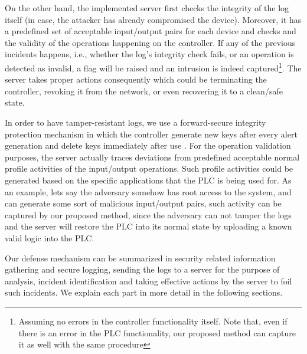 On the other hand, the implemented server first checks the integrity of the log itself (in case, the attacker has already compromised the device). Moreover, it has a predefined set of acceptable input/output pairs for each device and checks and the validity of the operations happening on the controller. If any of the previous incidents happens, i.e., whether the log's integrity check fails, or an operation is detected as invalid, a flag will be raised and an intrusion is indeed captured\footnote{Assuming no errors in the controller functionality itself. Note that, even if there is an error in the PLC functionality, our proposed method can capture it as well with the same procedure}. The server takes proper actions consequently which could be terminating the controller, revoking it from the network, or even recovering it to a clean/safe state.

In order to have tamper-resistant logs, we use a forward-secure integrity protection mechanism in which the controller generate new keys after every alert generation and delete keys immediately after use \cite{pillarbox}. For the operation validation purposes, the server actually traces deviations from predefined acceptable normal profile activities of the input/output operations. Such profile activities could be generated based on the specific applications that the PLC is being used for. As an example, lets say the adversary somehow has root access to the system, and can generate some sort of malicious input/output pairs, such activity can be captured by our proposed method, since the adversary can not tamper the logs and the server will restore the PLC into its normal state by uploading a known valid logic into the PLC.

Our defense mechanism can be summarized in security related information gathering and secure logging, sending the logs to a server for the purpose of analysis, incident identification and taking effective actions by the server to foil such incidents. We explain each part in more detail in the following sections.


